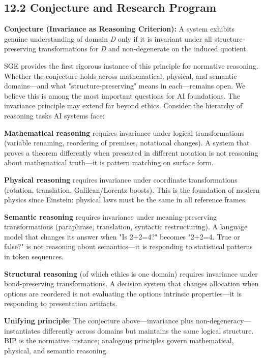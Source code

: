 \documentclass[12pt]{article}
\theoremstyle{plain}
\theoremstyle{definition}
\theoremstyle{remark}
\begin{document}
\subsection{12.2 Conjecture and Research
Program}\label{conjecture-and-research-program}

\textbf{Conjecture (Invariance as Reasoning Criterion):} A system
exhibits genuine understanding of domain \emph{D} only if it is
invariant under all structure-preserving transformations for \emph{D}
and non-degenerate on the induced quotient.

SGE provides the first rigorous instance of this principle for normative
reasoning. Whether the conjecture holds across mathematical, physical,
and semantic domains---and what "structure-preserving" means in
each---remains open. We believe this is among the most important
questions for AI foundations. The invariance principle may extend far
beyond ethics. Consider the hierarchy of reasoning tasks AI systems
face:

\textbf{Mathematical reasoning} requires invariance under logical
transformations (variable renaming, reordering of premises, notational
changes). A system that proves a theorem differently when presented in
different notation is not reasoning about mathematical truth---it is
pattern matching on surface form.

\textbf{Physical reasoning} requires invariance under coordinate
transformations (rotation, translation, Galilean/Lorentz boosts). This
is the foundation of modern physics since Einstein: physical laws must
be the same in all reference frames.

\textbf{Semantic reasoning} requires invariance under meaning-preserving
transformations (paraphrase, translation, syntactic restructuring). A
language model that changes its answer when "Is 2+2=4?" becomes "2+2=4.
True or false?" is not reasoning about semantics---it is responding to
statistical patterns in token sequences.

\textbf{Structural reasoning} (of which ethics is one domain) requires
invariance under bond-preserving transformations. A decision system that
changes allocation when options are reordered is not evaluating the
options\textquotesingle{} intrinsic properties---it is responding to
presentation artifacts.

\textbf{Unifying principle}: The conjecture above---invariance plus
non-degeneracy---instantiates differently across domains but maintains
the same logical structure. BIP is the normative instance; analogous
principles govern mathematical, physical, and semantic reasoning.
\end{document}
